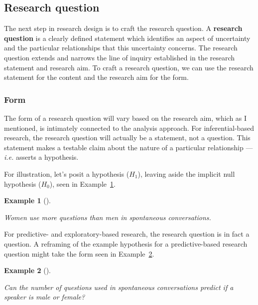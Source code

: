 \documentclass[
  letterpaper,
  krantz1]{latex/krantz-mod}
\theoremstyle{definition}
\theoremstyle{definition}
\newtheorem{example}{Example}[chapter]
\theoremstyle{remark}
\begin{document}
\subsection{Research question}\label{sec-research-question}

The next step in research design is to craft the research question. A
\textbf{research question} is a clearly defined
statement which identifies an aspect of uncertainty and the particular
relationships that this uncertainty concerns. The research question
extends and narrows the line of inquiry established in the research
statement and research aim. To craft a research question, we can use the
research statement for the content and the
research aim for the form.

\subsubsection{Form}\label{sec-research-question-form}

The form of a research question will vary based on the research aim,
which as I mentioned, is intimately connected to the analysis approach.
For inferential-based research,
the research question will actually be a
statement, not a question. This statement makes a testable claim about
the nature of a particular relationship ---\emph{i.e.} asserts a
hypothesis.

For illustration, let's posit a hypothesis
(\(H_1\)), leaving aside the implicit null
hypothesis (\(H_0\)), seen in
Example~\ref{exm-research-form-infer}.

\begin{example}[]\protect\hypertarget{exm-research-form-infer}{}\label{exm-research-form-infer}

\emph{Women use more questions than men in spontaneous conversations.}

\end{example}

For predictive- and
exploratory-based research, the
research question is in fact a question. A reframing of the example
hypothesis for a predictive-based research question might take the form
seen in Example~\ref{exm-research-form-pred}.

\begin{example}[]\protect\hypertarget{exm-research-form-pred}{}\label{exm-research-form-pred}

\emph{Can the number of questions used in spontaneous conversations
predict if a speaker is male or female?}

\end{example}
\end{document}
